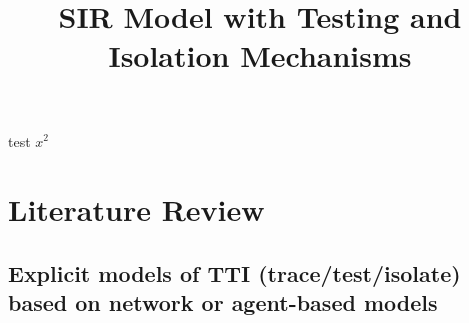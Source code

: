 \documentclass{article}
\title{SIR Model with Testing and Isolation Mechanisms}
\begin{document}
\maketitle
test $x^2$

\section{Literature Review}

\subsection{Explicit models of TTI (trace/test/isolate) based on network or agent-based models}



\end{document}
